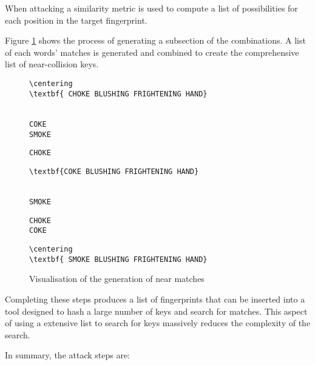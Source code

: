 When attacking a similarity metric is used to compute a list of possibilities for each position in the target fingerprint.

Figure \ref{fig:nearMatch} shows the process of generating a subsection of the combinations. A list of each words' matches is generated and combined to create the comprehensive list of near-collision keys.

\begin{figure}[h!]
    \centering
    \begin{BVerbatim}[commandchars=\\\{\}]
        \centering
\textbf{ CHOKE BLUSHING FRIGHTENING HAND}
    \end{BVerbatim}
    \\
    \verb|COKE                           |
    \\
    \verb|SMOKE                          |
    \\
    \hspace{1cm}



    \verb|CHOKE                          |
    \\
    \begin{BVerbatim}[commandchars=\\\{\}]
\textbf{COKE BLUSHING FRIGHTENING HAND}
    \end{BVerbatim}
    \\
    \verb|SMOKE                          |
    \\
    \hspace{1cm}


    \verb|CHOKE                          |
    \\
    \verb|COKE                           |
    \\
    \begin{BVerbatim}[commandchars=\\\{\}]
        \centering
\textbf{ SMOKE BLUSHING FRIGHTENING HAND}
    \end{BVerbatim}
    \caption{Visualisation of the generation of near matches}
    \label{fig:nearMatch}
\end{figure}

Completing these steps produces a list of fingerprints that can be inserted into a tool designed to hash a large number of keys and search for matches. This aspect of using a extensive list to search for keys massively reduces the complexity of the search.

In summary, the attack steps are:

